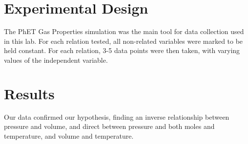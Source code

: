 \documentclass[12pt]{article}
\begin{document}
\section{Experimental Design}
The PhET Gas Properties simulation was the main tool for data collection used in this lab. For each relation tested, all non-related variables were marked to be held constant. For each relation, 3-5 data points were then taken, with varying values of the independent variable.

\section{Results}
Our data confirmed our hypothesis, finding an inverse relationship between pressure and volume, and direct between pressure and both moles and temperature, and volume and temperature.
\end{document}

